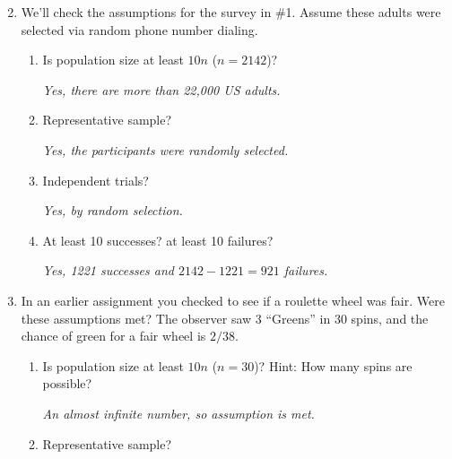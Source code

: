    \begin{enumerate}
     \setcounter{enumi}{1}
   \item We'll check the assumptions for the survey in \#1.  Assume
     these adults were selected via random phone number dialing.
     \begin{enumerate}
        \item Is population size at least $10n$ ($n = 2142$)? 
\begin{students}
        \vspace{.7cm}        
\end{students}
\begin{key}
  {\it  Yes, there are more than 22,000 US adults. }
\end{key}
        \item Representative sample?   
\begin{students}
        \vspace{.7cm}        
\end{students}

\begin{key}
  {\it Yes, the participants were randomly selected.}
\end{key}
        \item Independent trials?   
\begin{students}
        \vspace{.7cm}        
\end{students}

\begin{key}
  {\it Yes, by random selection.}
\end{key}
        \item At least 10 successes? at least 10 failures?   
\begin{students}
        \vspace{.7cm}        
\end{students}

\begin{key}
  {\it  Yes, 1221 successes and $2142-1221 = 921$ failures.}
\end{key}
\end{enumerate}

\item In an earlier assignment  you checked to see if a roulette wheel was
     fair.  Were these assumptions met? The
     observer saw 3 ``Greens'' in 30 spins, and the  chance of
     green for a fair wheel is $2/38$. 
     \begin{enumerate}
        \item Is population size at least $10n$ ($n = 30$)? 
          Hint: How many spins are possible?    
\begin{students}
        \vspace{.7cm}        
\end{students}
\begin{key}
  {\it  An almost infinite number, so assumption is met.}
\end{key}
        \item Representative sample?   
\begin{students}
        \vspace{.7cm}        
\end{students}


\end{enumerate}
\end{enumerate}
